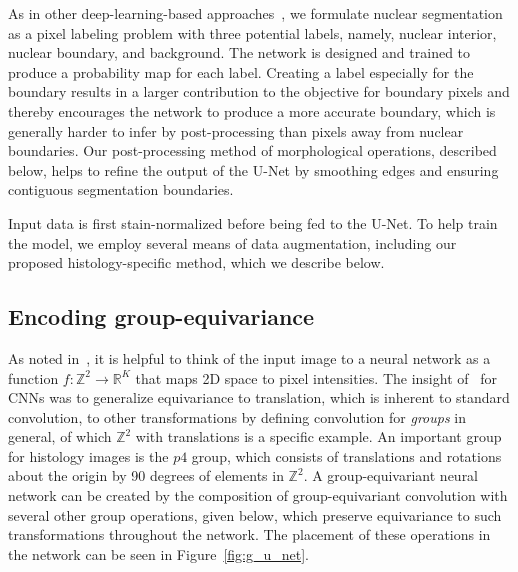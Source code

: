 As in other deep-learning-based approaches~\cite{he_dataset_kumar}, we formulate nuclear segmentation as a pixel labeling problem with three potential labels, namely, nuclear interior, nuclear boundary, and background.
The network is designed and trained to produce a probability map for each label.
Creating a label especially for the boundary results in a larger contribution to the objective for boundary pixels and thereby encourages the network to produce a more accurate boundary, which is generally harder to infer by post-processing than pixels away from nuclear boundaries.
Our post-processing method of morphological operations, described below, helps to refine the output of the U-Net by smoothing edges and ensuring contiguous segmentation boundaries.

Input data is first stain-normalized before being fed to the U-Net.
To help train the model, we employ several means of data augmentation, including our proposed histology-specific method, which we describe below. 

\subsection{Encoding group-equivariance}

As noted in~\cite{gcnn}, it is helpful to think of the input image to a neural network as a function $f\colon\mathbb{Z}^{2}\rightarrow \mathbb{R}^{K}$ that maps 2D space to pixel intensities.
The insight of~\cite{gcnn} for CNNs was to generalize equivariance to translation, which is inherent to standard convolution, to other transformations by defining convolution for \emph{groups} in general, of which $\mathbb{Z}^{2}$ with translations is a specific example.
An important group for histology images is the $p4$ group, which consists of translations and rotations about the origin by 90 degrees of elements in $\mathbb{Z}^{2}$.
A group-equivariant neural network can be created by the composition of group-equivariant convolution with several other group operations, given below, which preserve equivariance to such transformations throughout the network.
The placement of these operations in the network can be seen in Figure~\ref{fig:g_u_net}. 

